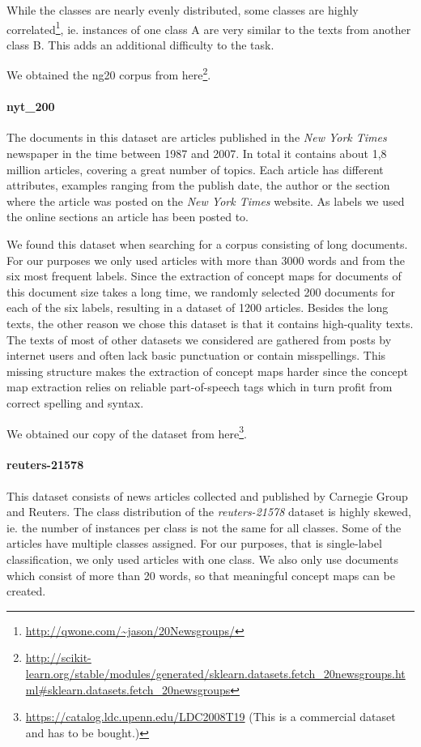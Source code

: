 While the classes are nearly evenly distributed, some classes are highly correlated\footnote{\url{http://qwone.com/~jason/20Newsgroups/}}, ie. instances of one class A are very similar to the texts from another class B. This adds an additional difficulty to the task.

We obtained the ng20 corpus from here\footnote{\url{http://scikit-learn.org/stable/modules/generated/sklearn.datasets.fetch\_20newsgroups.html\#sklearn.datasets.fetch_20newsgroups}}.

\paragraph{nyt\_200}
The documents in this dataset are articles published in the \textit{New York Times} newspaper in the time between 1987 and 2007.
In total it contains about 1,8 million articles, covering a great number of topics.
Each article has different attributes, examples ranging from the publish date, the author or the section where the article was posted on the \textit{New York Times} website.
As labels we used the online sections an article has been posted to.

We found this dataset when searching for a corpus consisting of long documents. 
For our purposes we only used articles with more than 3000 words and from the six most frequent labels.
Since the extraction of concept maps for documents of this document size takes a long time, we randomly selected 200 documents for each of the six labels, resulting in a dataset of 1200 articles.
Besides the long texts, the other reason we chose this dataset is that it contains high-quality texts.
The texts of most of other datasets we considered are gathered from posts by internet users and often lack basic punctuation or contain misspellings.
This missing structure makes the extraction of concept maps harder since the concept map extraction relies on reliable part-of-speech tags which in turn profit from correct spelling and syntax. 

We obtained our copy of the dataset from here\footnote{\url{https://catalog.ldc.upenn.edu/LDC2008T19} (This is a commercial dataset and has to be bought.)}.

\paragraph{reuters-21578}
This dataset consists of news articles collected and published by Carnegie Group and Reuters.
 The class distribution of the \textit{reuters-21578} dataset is highly skewed, ie. the number of instances per class is not the same for all classes.
 Some of the articles have multiple classes assigned. For our purposes, that is single-label classification, we only used articles with one class.
 We also only use documents which consist of more than 20 words, so that meaningful concept maps can be created.

